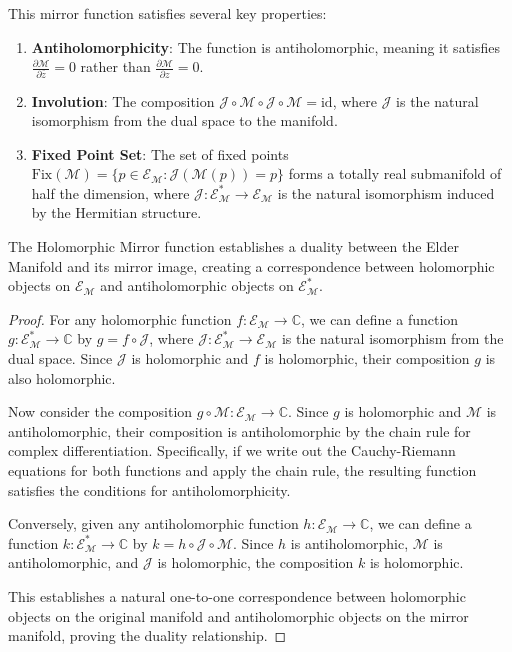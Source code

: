 This mirror function satisfies several key properties:

\begin{enumerate}
\item \textbf{Antiholomorphicity}: The function is antiholomorphic, meaning it satisfies $\frac{\partial \mathcal{M}}{\partial \overline{z}} = 0$ rather than $\frac{\partial \mathcal{M}}{\partial z} = 0$.
\item \textbf{Involution}: The composition $\mathcal{J} \circ \mathcal{M} \circ \mathcal{J} \circ \mathcal{M} = \text{id}$, where $\mathcal{J}$ is the natural isomorphism from the dual space to the manifold.
\item \textbf{Fixed Point Set}: The set of fixed points $\text{Fix}(\mathcal{M}) = \{p \in \mathcal{E}_{\mathcal{M}} : \mathcal{J}(\mathcal{M}(p)) = p\}$ forms a totally real submanifold of half the dimension, where $\mathcal{J}: \mathcal{E}_{\mathcal{M}}^* \rightarrow \mathcal{E}_{\mathcal{M}}$ is the natural isomorphism induced by the Hermitian structure.
\end{enumerate}

\begin{theorem}
The Holomorphic Mirror function establishes a duality between the Elder Manifold and its mirror image, creating a correspondence between holomorphic objects on $\mathcal{E}_{\mathcal{M}}$ and antiholomorphic objects on $\mathcal{E}_{\mathcal{M}}^*$.
\end{theorem}

\begin{proof}
For any holomorphic function $f: \mathcal{E}_{\mathcal{M}} \rightarrow \mathbb{C}$, we can define a function $g: \mathcal{E}_{\mathcal{M}}^* \rightarrow \mathbb{C}$ by $g = f \circ \mathcal{J}$, where $\mathcal{J}: \mathcal{E}_{\mathcal{M}}^* \rightarrow \mathcal{E}_{\mathcal{M}}$ is the natural isomorphism from the dual space. Since $\mathcal{J}$ is holomorphic and $f$ is holomorphic, their composition $g$ is also holomorphic.

Now consider the composition $g \circ \mathcal{M}: \mathcal{E}_{\mathcal{M}} \rightarrow \mathbb{C}$. Since $g$ is holomorphic and $\mathcal{M}$ is antiholomorphic, their composition is antiholomorphic by the chain rule for complex differentiation. Specifically, if we write out the Cauchy-Riemann equations for both functions and apply the chain rule, the resulting function satisfies the conditions for antiholomorphicity.

Conversely, given any antiholomorphic function $h: \mathcal{E}_{\mathcal{M}} \rightarrow \mathbb{C}$, we can define a function $k: \mathcal{E}_{\mathcal{M}}^* \rightarrow \mathbb{C}$ by $k = h \circ \mathcal{J} \circ \mathcal{M}$. Since $h$ is antiholomorphic, $\mathcal{M}$ is antiholomorphic, and $\mathcal{J}$ is holomorphic, the composition $k$ is holomorphic.

This establishes a natural one-to-one correspondence between holomorphic objects on the original manifold and antiholomorphic objects on the mirror manifold, proving the duality relationship.
\end{proof}

